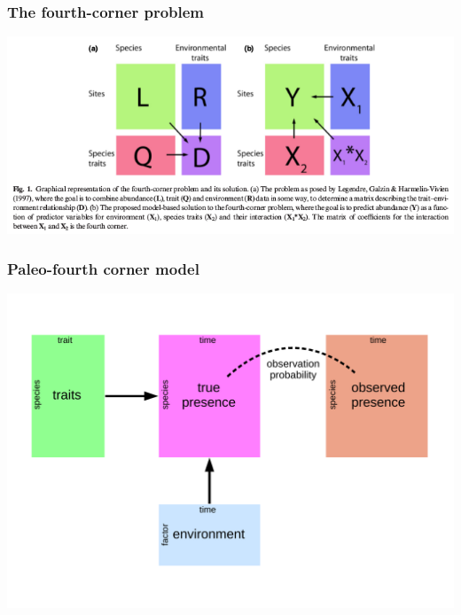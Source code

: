 \documentclass{beamer}
\begin{document}
\begin{frame}
  \frametitle{The fourth-corner problem}

  \begin{center}
    \includegraphics[height=0.8\textheight,width=\textwidth,keepaspectratio=true]{figure/warton_fourth_corner}
  \end{center}
  
\end{frame}

\begin{frame}
  \frametitle{Paleo-fourth corner model}

  \begin{center}
    \includegraphics[height=0.8\textheight,width=\textwidth,keepaspectratio=true]{figure/paleo_fourth_corner}
  \end{center}
\end{frame}
\end{document}
